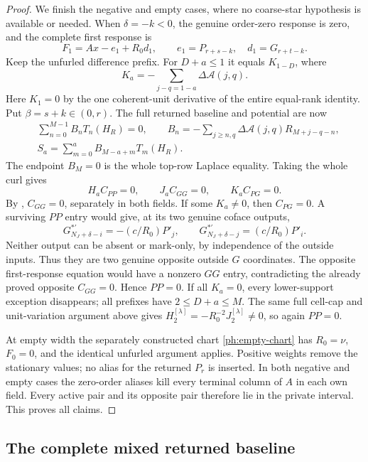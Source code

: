 \documentclass[11pt,a4paper]{amsart}
\numberwithin{equation}{section}
\theoremstyle{plain}
\theoremstyle{definition}
\begin{document}
\begin{proof}
We finish the negative and empty cases, where no coarse-star hypothesis
is available or needed.  When \(\delta=-k<0\), the genuine order-zero
response is zero, and the complete first response is
\[
 F_1=Ax-e_1+R_0d_1,\qquad
 e_1=P_{r+s-k},\quad d_1=G_{r+t-k}.
\]
Keep the unfurled difference prefix.  For \(D+a\le1\) it equals
\(K_{1-D}\), where
\[
 K_a=-\sum_{j-q=1-a}\Delta\mathcal A(j,q).
\]
Here \(K_1=0\) by the one coherent-unit derivative of the entire
equal-rank identity.
Put \(\beta=s+k\in(0,r)\).
The full returned baseline and potential are now
\[
 \begin{aligned}
 &\sum_{n=0}^{M-1}B_nT_n(H_R)=0,\qquad
 B_n=-\sum_{j\ge n,q}\Delta\mathcal A(j,q)R_{M+j-q-n},\\
 &S_a=\sum_{m=0}^{a}B_{M-a+m}T_m(H_R).
 \end{aligned}
\]
The endpoint \(B_M=0\) is the whole top-row Laplace equality.
Taking the whole curl gives
\[
 H_aC_{PP}=0,\qquad J_aC_{GG}=0,\qquad K_aC_{PG}=0.
\]
By , \(C_{GG}=0\), separately in both fields.
If some \(K_a\ne0\), then \(C_{PG}=0\).
A surviving \(PP\) entry would give, at its two genuine coface outputs,
\[
 G^{*'}_{N_J+\delta-i}=-(c/R_0)P'_j,\qquad
 G^{*'}_{N_J+\delta-j}=(c/R_0)P'_i.
\]
Neither output can be absent or mark-only, by independence of the
outside inputs.  Thus they are two genuine opposite outside \(G\)
coordinates.  The opposite first-response equation would have a
nonzero \(GG\) entry, contradicting the already proved opposite
\(C_{GG}=0\).  Hence \(PP=0\).
If all \(K_a=0\), every lower-support exception disappears; all prefixes
have \(2\le D+a\le M\).  The same full cell-cap and unit-variation argument
above gives \(H_2^{[\lambda]}=-R_0^{-2}J_2^{[\lambda]}\ne0\), so again
\(PP=0\).

At empty width the separately constructed chart
\eqref{ph:empty-chart} has \(R_0=\nu\), \(F_0=0\), and the identical
unfurled argument applies.  Positive weights remove the stationary
values; no alias for the returned \(P_r\) is inserted.
In both negative and empty cases the zero-order aliases kill every
terminal column of \(A\) in each own field.  Every active pair and its
opposite pair therefore lie in the private interval.  This proves all
claims.
\end{proof}

\subsection{The complete mixed returned baseline}
\end{document}
